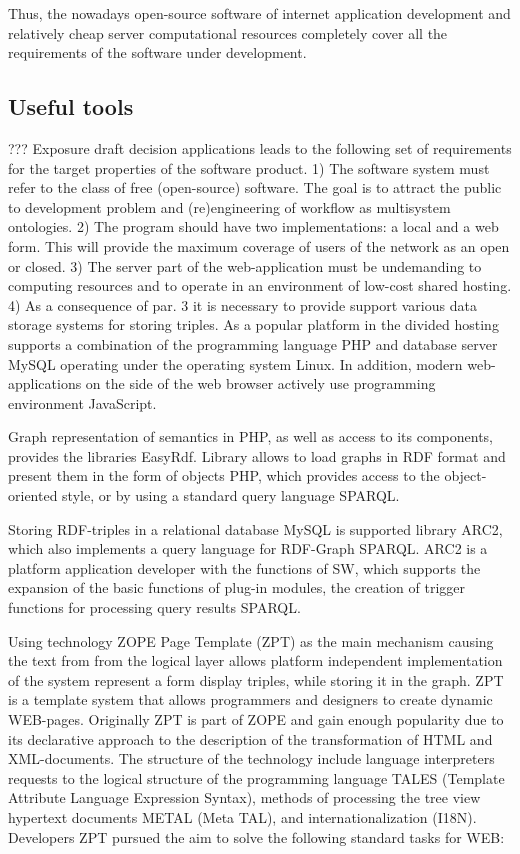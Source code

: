 \documentclass[conference]{IEEEtran}
\begin{document}
Thus, the nowadays open-source software of internet application
development and relatively cheap server computational resources
completely cover all the requirements of the software under
development.


\subsection{Useful tools}
\label{sec:useful-tools}

	??? Exposure draft decision applications leads to the following set of requirements for the target properties of the software product.
1) The software system must refer to the class of free (open-source) software. The goal is to attract the public to development problem and (re)engineering of workflow as multisystem ontologies.
2) The program should have two implementations: a local and a web form. This will provide the maximum coverage of users of the network as an open or closed.
3) The server part of the web-application must be undemanding to computing resources and to operate in an environment of low-cost shared hosting.
4) As a consequence of par. 3 it is necessary to provide support various data storage systems for storing triples.
As a popular platform in the divided hosting supports a combination of the programming language PHP and database server MySQL operating under the operating system Linux. In addition, modern web-applications on the side of the web browser actively use programming environment JavaScript.

	Graph representation of semantics in PHP, as well as access to its components, provides the libraries EasyRdf. Library allows to load graphs in RDF format and present them in the form of objects PHP, which provides access to the object-oriented style, or by using a standard query language SPARQL.

	Storing RDF-triples in a relational database MySQL is supported library ARC2, which also implements a query language for RDF-Graph SPARQL. ARC2 is a platform application developer with the functions of SW, which supports the expansion of the basic functions of plug-in modules, the creation of trigger functions for processing query results SPARQL.

	Using technology ZOPE Page Template (ZPT) as the main mechanism causing the text from from the logical layer allows platform independent implementation of the system represent a form display triples, while storing it in the graph. ZPT is a template system that allows programmers and designers to create dynamic WEB-pages. Originally ZPT is part of ZOPE and gain enough popularity due to its declarative approach to the description of the transformation of HTML and XML-documents. The structure of the technology include language interpreters requests to the logical structure of the programming language TALES (Template Attribute Language Expression Syntax), methods of processing the tree view hypertext documents METAL (Meta TAL), and internationalization (I18N). Developers ZPT pursued the aim to solve the following standard tasks for WEB:
\end{document}
